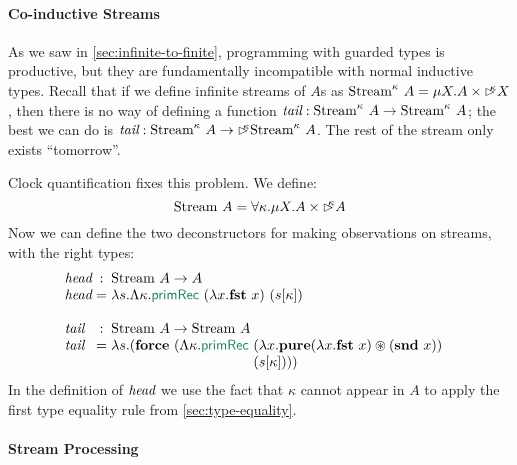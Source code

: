 \paragraph{Co-inductive Streams} As we saw in
\autoref{sec:infinite-to-finite}, programming with guarded types is
productive, but they are fundamentally incompatible with normal
inductive types. Recall that if we define infinite streams of $A$s as
$\textrm{Stream}^\kappa~A = \mu X. A \times \mathord{\rhd\kern-0.4em^{\kappa}} X$, then
there is no way of defining a function $\textit{tail} :
\textrm{Stream}^\kappa~A \to \textrm{Stream}^\kappa~A$; the best we
can do is $\textit{tail} : \textrm{Stream}^\kappa~A \to
\mathord{\rhd\kern-0.4em^{\kappa}}\textrm{Stream}^\kappa~A$. The rest of the stream only
exists ``tomorrow''.

Clock quantification fixes this problem. We define:
\begin{displaymath}
  \textrm{Stream}~A = \forall \kappa. \mu X. A \times \mathord{\rhd\kern-0.4em^{\kappa}} A
\end{displaymath}
Now we can define the two deconstructors for making observations on
streams, with the right types:
\begin{displaymath}
  \begin{array}{@{}l@{\hspace{0.3em}}c@{\hspace{0.3em}}l}
    \ident{head} &:& \tyname{Stream}~A \to A \\
    \ident{head} &=& \lambda s. \Lambda \kappa. \elim{primRec}~(\lambda x. \kw{fst}~x)~(s[\kappa]) \\
    \\
    \ident{tail} &:& \tyname{Stream}~A \to \tyname{Stream}~A \\
    \ident{tail} &=& \lambda s. (\kw{force}~(\Lambda \kappa. \elim{primRec}~
    \begin{array}[t]{@{}l}
      (\lambda x. \kw{pure}(\lambda x. \kw{fst}~x) \circledast (\kw{snd}~x)) \\
      (s[\kappa])))
    \end{array}
  \end{array}
\end{displaymath}
In the definition of $\textit{head}$ we use the fact that $\kappa$
cannot appear in $A$ to apply the first type equality rule from
\autoref{sec:type-equality}.

\paragraph{Stream Processing}

